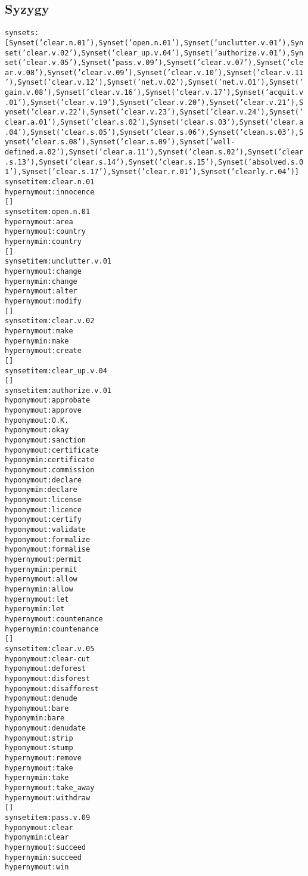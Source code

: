 \subsection{Syzygy}

\begin{alltt}
synsets:
[Synset('clear.n.01'), Synset('open.n.01'), Synset('unclutter.v.01'), Synset('clear.v.02'), Synset('clear_up.v.04'), Synset('authorize.v.01'), Synset('clear.v.05'), Synset('pass.v.09'), Synset('clear.v.07'), Synset('clear.v.08'), Synset('clear.v.09'), Synset('clear.v.10'), Synset('clear.v.11'), Synset('clear.v.12'), Synset('net.v.02'), Synset('net.v.01'), Synset('gain.v.08'), Synset('clear.v.16'), Synset('clear.v.17'), Synset('acquit.v.01'), Synset('clear.v.19'), Synset('clear.v.20'), Synset('clear.v.21'), Synset('clear.v.22'), Synset('clear.v.23'), Synset('clear.v.24'), Synset('clear.a.01'), Synset('clear.s.02'), Synset('clear.s.03'), Synset('clear.a.04'), Synset('clear.s.05'), Synset('clear.s.06'), Synset('clean.s.03'), Synset('clear.s.08'), Synset('clear.s.09'), Synset('well-defined.a.02'), Synset('clear.a.11'), Synset('clean.s.02'), Synset('clear.s.13'), Synset('clear.s.14'), Synset('clear.s.15'), Synset('absolved.s.01'), Synset('clear.s.17'), Synset('clear.r.01'), Synset('clearly.r.04')]% chktex 36
synset item:clear.n.01
hypernym out:innocence
[]
synset item:open.n.01
hypernym out:area
hypernym out:country
hypernym in:country
[]
synset item:unclutter.v.01
hypernym out:change
hypernym in:change
hypernym out:alter
hypernym out:modify
[]
synset item:clear.v.02
hypernym out:make
hypernym in:make
hypernym out:create
[]
synset item:clear_up.v.04
[]
synset item:authorize.v.01
hyponym out:approbate
hyponym out:approve
hyponym out:O.K.
hyponym out:okay
hyponym out:sanction
hyponym out:certificate
hyponym in:certificate
hyponym out:commission
hyponym out:declare
hyponym in:declare
hyponym out:license
hyponym out:licence
hyponym out:certify
hyponym out:validate
hyponym out:formalize
hyponym out:formalise
hypernym out:permit
hypernym in:permit
hypernym out:allow
hypernym in:allow
hypernym out:let
hypernym in:let
hypernym out:countenance
hypernym in:countenance
[]
synset item:clear.v.05
hyponym out:clear-cut
hyponym out:deforest
hyponym out:disforest
hyponym out:disafforest
hyponym out:denude
hyponym out:bare
hyponym in:bare
hyponym out:denudate
hyponym out:strip
hyponym out:stump
hypernym out:remove
hypernym out:take
hypernym in:take
hypernym out:take_away
hypernym out:withdraw
[]
synset item:pass.v.09
hyponym out:clear
hyponym in:clear
hypernym out:succeed
hypernym in:succeed
hypernym out:win

\end{alltt}
